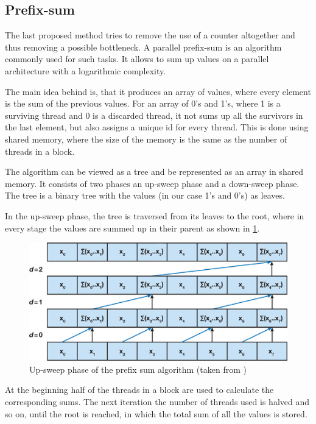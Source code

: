 \subsection{Prefix-sum}\label{sec:prefixsum}

The last proposed method tries to remove the use of a counter altogether and thus removing a possible bottleneck. A parallel prefix-sum is an algorithm commonly used for such tasks. It allows to sum up values on a parallel architecture with a logarithmic complexity.

The main idea behind is, that it produces an array of values, where every element is the sum of the previous values. For an array of 0's and 1's, where 1 is a surviving thread and 0 is a discarded thread, it not sums up all the survivors in the last element, but also assigns a unique id for every thread. This is done using shared memory, where the size of the memory is the same as the number of threads in a block.

The algorithm can be viewed as a tree and be represented as an array in shared memory. It consists of two phases an up-sweep phase and a down-sweep phase. The tree is a binary tree with the values (in our case 1's and 0's) as leaves.

In the up-sweep phase, the tree is traversed from its leaves to the root, where in every stage the values are summed up in their parent as shown in \ref{fig:sweepup}.

\begin{center}
\begin{figure}[h]
	\centering\includegraphics[width=0.6\linewidth]{fig/sweepup.jpg}
	\caption{Up-sweep phase of the prefix sum algorithm (taken from \cite{gems-prefixsum})}
	\label{fig:sweepup}
\end{figure}
\end{center}

At the beginning half of the threads in a block are used to calculate the corresponding sums. The next iteration the number of threads used is halved and so on, until the root is reached, in which the total sum of all the values is stored.

